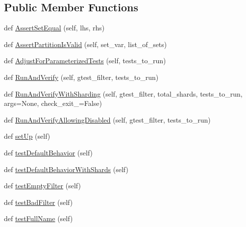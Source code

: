 \subsection*{Public Member Functions}
\begin{DoxyCompactItemize}
\item 
def \hyperlink{classgtest__filter__unittest_1_1GTestFilterUnitTest_aeebdbdcc59594ad0a69cf11eafe94997}{Assert\+Set\+Equal} (self, lhs, rhs)
\item 
def \hyperlink{classgtest__filter__unittest_1_1GTestFilterUnitTest_a87656eac0cf4136252eef43da0121381}{Assert\+Partition\+Is\+Valid} (self, set\+\_\+var, list\+\_\+of\+\_\+sets)
\item 
def \hyperlink{classgtest__filter__unittest_1_1GTestFilterUnitTest_a11c48bf404bca6806b14a1a71d169ace}{Adjust\+For\+Parameterized\+Tests} (self, tests\+\_\+to\+\_\+run)
\item 
def \hyperlink{classgtest__filter__unittest_1_1GTestFilterUnitTest_acf341ed9a265b346a050afa9a9a85c65}{Run\+And\+Verify} (self, gtest\+\_\+filter, tests\+\_\+to\+\_\+run)
\item 
def \hyperlink{classgtest__filter__unittest_1_1GTestFilterUnitTest_a2022ed99e18a6e5afd1023b9dd19d6e0}{Run\+And\+Verify\+With\+Sharding} (self, gtest\+\_\+filter, total\+\_\+shards, tests\+\_\+to\+\_\+run, args=None, check\+\_\+exit\+\_=False)
\item 
def \hyperlink{classgtest__filter__unittest_1_1GTestFilterUnitTest_ae52bd70ef1dcb68c83c0379ddfb987a9}{Run\+And\+Verify\+Allowing\+Disabled} (self, gtest\+\_\+filter, tests\+\_\+to\+\_\+run)
\item 
def \hyperlink{classgtest__filter__unittest_1_1GTestFilterUnitTest_af20a71b1659314a5cc1093d77a673495}{set\+Up} (self)
\item 
def \hyperlink{classgtest__filter__unittest_1_1GTestFilterUnitTest_adef3a9b539c73bda785a631a5aac424f}{test\+Default\+Behavior} (self)
\item 
def \hyperlink{classgtest__filter__unittest_1_1GTestFilterUnitTest_a8d5ad564f41c052864a3957a71daa535}{test\+Default\+Behavior\+With\+Shards} (self)
\item 
def \hyperlink{classgtest__filter__unittest_1_1GTestFilterUnitTest_afce65847b463ec5bca4458e9348d9a9f}{test\+Empty\+Filter} (self)
\item 
def \hyperlink{classgtest__filter__unittest_1_1GTestFilterUnitTest_a2456062c177350a53244aea030aaf617}{test\+Bad\+Filter} (self)
\item 
def \hyperlink{classgtest__filter__unittest_1_1GTestFilterUnitTest_a336d9203e26493bae11fbb514af38a6b}{test\+Full\+Name} (self)

\end{DoxyCompactItemize}
